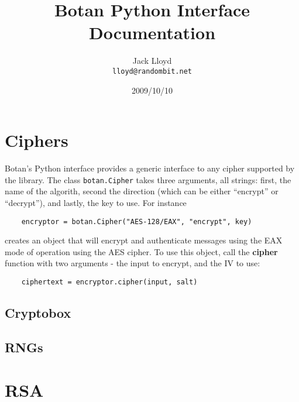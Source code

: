 \documentclass{article}
\title{\textbf{Botan Python Interface Documentation}}
\author{Jack Lloyd \\
        \texttt{lloyd@randombit.net}}
\date{2009/10/10}
\newcommand{\function}[1]{\textbf{#1}}
\newcommand{\type}[1]{\texttt{#1}}
\begin{document}
\maketitle

\tableofcontents

\parskip=5pt
\pagebreak

\section{Ciphers}

Botan's Python interface provides a generic interface to any cipher
supported by the library. The class \type{botan.Cipher} takes three
arguments, all strings: first, the name of the algorith, second the
direction (which can be either ``encrypt'' or ``decrypt''), and
lastly, the key to use. For instance

\begin{verbatim}
    encryptor = botan.Cipher("AES-128/EAX", "encrypt", key)
\end{verbatim}

creates an object that will encrypt and authenticate messages using
the EAX mode of operation using the AES cipher. To use this object,
call the \function{cipher} function with two arguments - the input
to encrypt, and the IV to use:

\begin{verbatim}
    ciphertext = encryptor.cipher(input, salt)
\end{verbatim}


\subsection{Cryptobox}


\subsection{RNGs}

\section{RSA}
\end{document}
